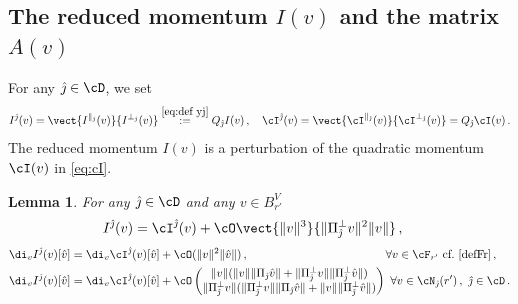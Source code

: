 \documentclass[11pt,a4paper,reqno]{article}
\numberwithin{equation}{section}
\newtheorem{lemma}[theorem]{Lemma}
\theoremstyle{definition}
\begin{document}
\subsection{The reduced momentum $ I(v) $ and the matrix $ A(v)$}
\label{sec:prel}


For any $ {\hat \jmath} \in \cD  $, we set 
    \begin{equation}\label{Def I dritto j}
    I^{\hat \jmath} (v) =\vect{I^{\parallel_{\hat \jmath}}(v)}{I^{\bot_{\hat \jmath}}(v)}
    \stackrel{\eqref{eq:def yj}} {:=} 
    Q_{\hat \jmath}I(v)  \, , 
    \quad \cI^{\hat \jmath}(v) = \vect{\cI^{\parallel_{\hat \jmath}}(v)}{\cI^{\bot_{\hat \jmath}}(v)} = Q_{\hat \jmath}\cI(v) \, .
    \end{equation}
The reduced momentum $ I(v) $ is a perturbation of the quadratic momentum $ \cI (v) $ in \eqref{eq:cI}. 
    
    \begin{lemma}\label{Properties of I dritto}
     For any ${\hat \jmath} \in \cD$ and any $v\in
    B_{r'}^V $ 
     \begin{align}
         \label{Estimate on Ij}
         &     I^{\hat \jmath}(v)=  \cI^{\hat \jmath}(v)+\cO\vect{\|v\|^3}{\|\Pi_{\hat \jmath}^\bot v\|^2 \|v \|}\, ,
         \end{align}
         \begin{equation}\label{Estimate on d I1Q dritto}
        \begin{aligned}
            &\di_v I^{\hat \jmath}(v)[\hat v]=\di_v \cI^{\hat \jmath}(v)[\hat v]+\cO(\|v\|^2\|\hat v\|) \, ,  \qquad \qquad \qquad \qquad \quad \qquad \ \ \,   \forall  v\in \cF_{r'}  \ \text{cf.} \  \eqref{defFr} \, ,  \\
            &\di_v I^{\hat \jmath}(v)[\hat v]=
            \di_v \cI^{\hat \jmath}(v)[\hat v]+\cO\begin{pmatrix}
                \|v\|(\|v\|\|\Pi_{\hat \jmath} \hat v\|+\|\Pi_{\hat \jmath}^\bot v\|\|\Pi_{\hat \jmath}^\bot \hat v\|)\\
                \|\Pi_{\hat \jmath}^\bot v\|(\|\Pi_{\hat \jmath}^\bot v\|\|\Pi_{\hat \jmath} \hat v\|+\|v\|\|\Pi_{\hat \jmath}^\bot \hat v\|)
            \end{pmatrix} \ \forall  v\in \cN_{\hat \jmath}(r')\, ,\   \hat \jmath \in \cD \, .
        \end{aligned}
    \end{equation}
    \end{lemma}
    
\end{document}
